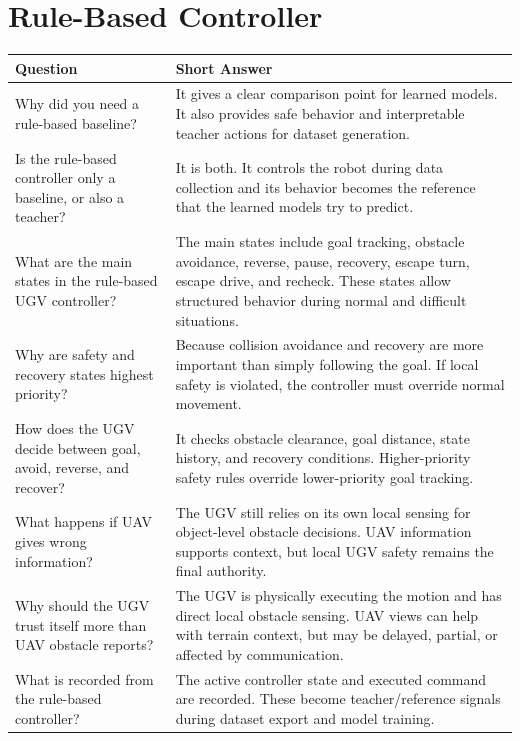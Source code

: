 \documentclass[11pt,a4paper]{article}
\begin{document}
\section*{Rule-Based Controller}
\begin{longtable}{QA}
\toprule
\textbf{Question} & \textbf{Short Answer} \\
\midrule
\endhead
Why did you need a rule-based baseline? &
It gives a clear comparison point for learned models. It also provides safe behavior and interpretable teacher actions for dataset generation. \\
\addlinespace
Is the rule-based controller only a baseline, or also a teacher? &
It is both. It controls the robot during data collection and its behavior becomes the reference that the learned models try to predict. \\
\addlinespace
What are the main states in the rule-based UGV controller? &
The main states include goal tracking, obstacle avoidance, reverse, pause, recovery, escape turn, escape drive, and recheck. These states allow structured behavior during normal and difficult situations. \\
\addlinespace
Why are safety and recovery states highest priority? &
Because collision avoidance and recovery are more important than simply following the goal. If local safety is violated, the controller must override normal movement. \\
\addlinespace
How does the UGV decide between goal, avoid, reverse, and recover? &
It checks obstacle clearance, goal distance, state history, and recovery conditions. Higher-priority safety rules override lower-priority goal tracking. \\
\addlinespace
What happens if UAV gives wrong information? &
The UGV still relies on its own local sensing for object-level obstacle decisions. UAV information supports context, but local UGV safety remains the final authority. \\
\addlinespace
Why should the UGV trust itself more than UAV obstacle reports? &
The UGV is physically executing the motion and has direct local obstacle sensing. UAV views can help with terrain context, but may be delayed, partial, or affected by communication. \\
\addlinespace
What is recorded from the rule-based controller? &
The active controller state and executed command are recorded. These become teacher/reference signals during dataset export and model training. \\
\bottomrule
\end{longtable}
\end{document}
